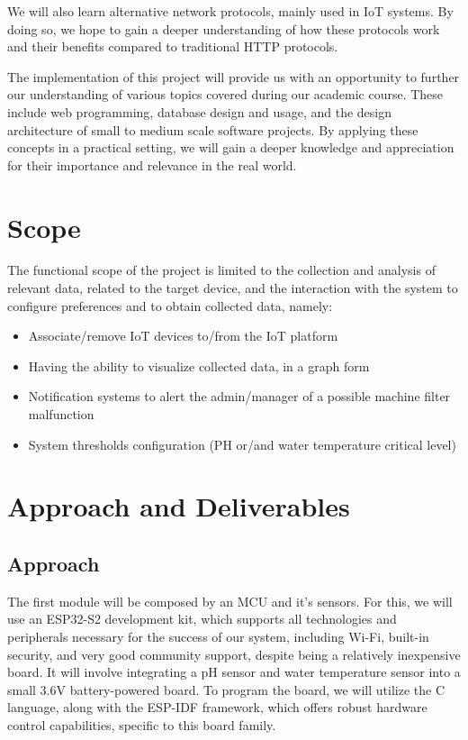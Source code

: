 \documentclass[a4paper,twoside,11pt]{article}
\begin{document}
We will also learn alternative network protocols, mainly used in IoT systems. By doing so, we hope to gain a deeper understanding of how these protocols work and their benefits compared to traditional HTTP protocols.

The implementation of this project will provide us with an opportunity to further our understanding of various topics covered during our academic course. These include web programming, database design and usage, and the design architecture of small to medium scale software projects. By applying these concepts in a practical setting, we will gain a deeper knowledge and appreciation for their importance and relevance in the real world. 


\section{Scope}
The functional scope of the project is limited to the collection and analysis of relevant data, related to the target device, and the interaction with the system to configure preferences and to obtain collected data, namely:
\begin{itemize}
    \item Associate/remove IoT devices to/from the IoT platform
    \item Having the ability to visualize collected data, in a graph form
    \item Notification systems to alert the admin/manager of a possible machine filter malfunction
    \item System thresholds configuration (PH or/and water temperature critical level)
\end{itemize}

\section{Approach and Deliverables}
\subsection{Approach}

The first module will be composed by an MCU and it's sensors. For this, we will use an ESP32-S2 development kit, which supports all technologies and peripherals necessary for the success of our system, including Wi-Fi, built-in security, and very good community support, despite being a relatively inexpensive board. It will involve integrating a pH sensor and water temperature sensor into a small 3.6V battery-powered board. To program the board, we will utilize the C language, along with the ESP-IDF framework, which offers robust hardware control capabilities, specific to this board family.
\end{document}
